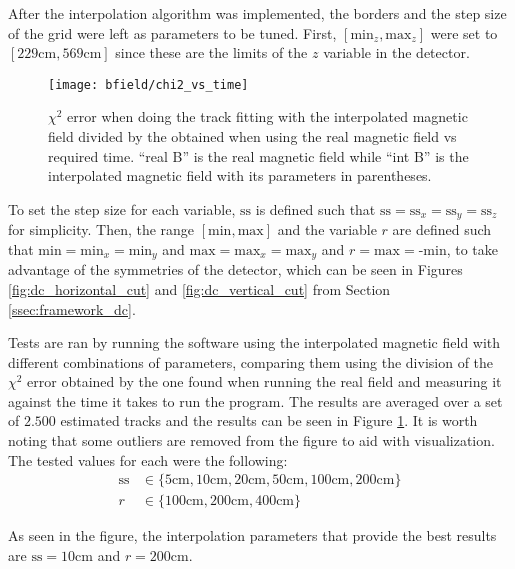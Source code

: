 After the interpolation algorithm was implemented, the borders and the step size of the grid were left as parameters to be tuned.
First, $[\text{min}_z, \text{max}_z]$ were set to $[229 \text{cm}, 569 \text{cm}]$ since these are the limits of the $z$ variable in the detector.

    \begin{figure}[ht]
        \centering
        \texttt{[image: bfield/chi2\_vs\_time]}
        \caption{\label{fig:bfield_chi2_vs_time} $\chi^2$ error when doing the track fitting with the interpolated magnetic field divided by the obtained when using the real magnetic field vs required time. ``real B'' is the real magnetic field while ``int B'' is the interpolated magnetic field with its parameters in parentheses.}
    \end{figure}

To set the step size for each variable, $\text{ss}$ is defined such that $\text{ss} = \text{ss}_x = \text{ss}_y = \text{ss}_z$ for simplicity.
Then, the range $[\text{min}, \text{max}]$ and the variable $r$ are defined such that $\text{min} = \text{min}_x = \text{min}_y$ and $\text{max} = \text{max}_x = \text{max}_y$ and $r = \text{max} = \text{-min}$, to take advantage of the symmetries of the detector, which can be seen in Figures \ref{fig:dc_horizontal_cut} and \ref{fig:dc_vertical_cut} from Section \ref{ssec:framework_dc}.

Tests are ran by running the software using the interpolated magnetic field with different combinations of parameters, comparing them using the division of the $\chi^2$ error obtained by the one found when running the real field and measuring it against the time it takes to run the program.
The results are averaged over a set of $2.500$ estimated tracks and the results can be seen in Figure \ref{fig:bfield_chi2_vs_time}.
It is worth noting that some outliers are removed from the figure to aid with visualization.
The tested values for each were the following:
    \begin{align*}
        \text{ss} &\in \{5 \text{cm}, 10 \text{cm}, 20 \text{cm}, 50 \text{cm}, 100 \text{cm}, 200 \text{cm}\}\\
        r &\in \{100 \text{cm}, 200 \text{cm}, 400 \text{cm}\}
    \end{align*}

As seen in the figure, the interpolation parameters that provide the best results are $\text{ss} = 10 \text{cm}$ and $r = 200 \text{cm}$.

